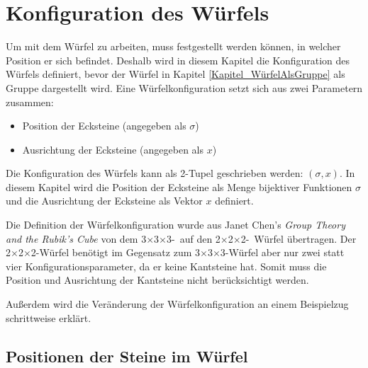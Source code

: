 \documentclass[12pt,a4paper, usenames, dvipsnames]{article}
\theoremstyle{mystyle}
\theoremstyle{definition}
\newtheorem{bsp}{Beispiel}[definition]
\newcommand{\Ttwo}{2$\times$2$\times$2-}
\newcommand{\Tthree}{3$\times$3$\times$3-}
\begin{document}
%
%
%
%
%
%
%
%
%
%
\newpage

\section{Konfiguration des Würfels}

\label{Kapitel_KonfigurationDesWürfels}

Um mit dem Würfel zu arbeiten, muss festgestellt werden können, in welcher Position er sich befindet.
Deshalb wird in diesem Kapitel die Konfiguration des Würfels definiert, bevor der Würfel in Kapitel \ref{Kapitel_WürfelAlsGruppe} als Gruppe dargestellt wird. Eine Würfelkonfiguration setzt sich aus zwei Parametern zusammen: 
\begin{itemize}
\item Position der Ecksteine (angegeben als $\sigma$)
\item Ausrichtung der Ecksteine (angegeben als $x$)
\end{itemize}
Die Konfiguration des Würfels kann als 2-Tupel geschrieben werden: $(\sigma, x)$.
In diesem Kapitel wird die Position der Ecksteine als Menge bijektiver Funktionen $\sigma$ und die Ausrichtung der Ecksteine als Vektor $x$ definiert.

Die Definition der Würfelkonfiguration wurde aus Janet Chen's \textit{Group Theory and the Rubik's Cube} \cite{JC} von dem \Tthree \ auf den \Ttwo \ Würfel übertragen. Der \Ttwo Würfel benötigt im Gegensatz zum \Tthree Würfel aber nur zwei statt vier Konfigurationsparameter, da er keine Kantsteine hat. Somit muss die Position und Ausrichtung der Kantsteine nicht berücksichtigt werden.


Außerdem wird die Veränderung der Würfelkonfiguration an einem Beispielzug schrittweise erklärt.

%
%
%
%
%
%
%
%
%
%
%
%
%
%
%
%
%
%
%
%

\subsection{Positionen der Steine im Würfel} 
\end{document}
